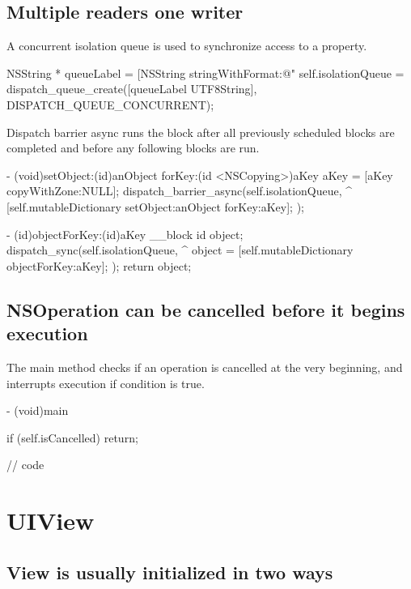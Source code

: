 \documentclass[10pt]{extarticle}
\newenvironment{codelisting}
{\footnotesize\mdframed[middlelinewidth=0.5pt, middlelinecolor=BaliHaiColor, skipabove=15pt]\verbatim}
{\endverbatim\endmdframed\vspace{12pt}\normalsize}
\begin{document}
\subsection{Multiple readers one writer}

A concurrent isolation queue is used to synchronize access to a property.

\begin{codelisting}
NSString * queueLabel = [NSString stringWithFormat:@"%
self.isolationQueue = dispatch_queue_create([queueLabel UTF8String], DISPATCH_QUEUE_CONCURRENT);
\end{codelisting}

Dispatch barrier async runs the block after all previously scheduled blocks are completed and before any following blocks are run.

\begin{codelisting}
- (void)setObject:(id)anObject forKey:(id <NSCopying>)aKey
{
    aKey = [aKey copyWithZone:NULL];
    dispatch_barrier_async(self.isolationQueue, ^{
        [self.mutableDictionary setObject:anObject forKey:aKey];
    });
}

- (id)objectForKey:(id)aKey
{
    __block id object;
    dispatch_sync(self.isolationQueue, ^{
        object = [self.mutableDictionary objectForKey:aKey];
    });
    return object;
}
\end{codelisting}


\subsection{NSOperation can be cancelled before it begins execution}

The main method checks if an operation is cancelled at the very beginning, and interrupts execution if condition is true.

\begin{codelisting}
- (void)main
{
    if (self.isCancelled) return;
    
    // code
}
\end{codelisting}


\section{UIView}

\subsection{View is usually initialized in two ways}
\end{document}
